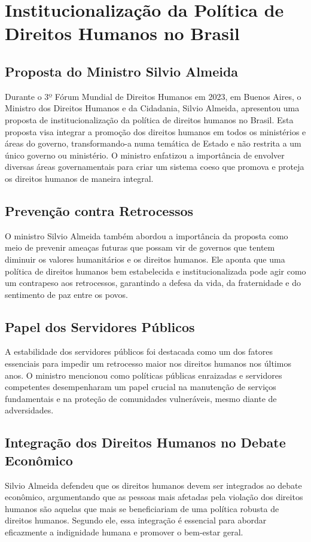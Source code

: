 \documentclass[
   article,       
   12pt,          
   oneside,       
   a4paper,       
   english,       
   brazil,        
   sumario=tradicional
   ]{abntex2}
\begin{document}
\section{Institucionalização da Política de Direitos Humanos no Brasil}

\subsection{Proposta do Ministro Silvio Almeida}
Durante o 3º Fórum Mundial de Direitos Humanos em 2023, em Buenos Aires, o Ministro dos Direitos Humanos e da Cidadania, Silvio Almeida, apresentou uma proposta de institucionalização da política de direitos humanos no Brasil. Esta proposta visa integrar a promoção dos direitos humanos em todos os ministérios e áreas do governo, transformando-a numa temática de Estado e não restrita a um único governo ou ministério. O ministro enfatizou a importância de envolver diversas áreas governamentais para criar um sistema coeso que promova e proteja os direitos humanos de maneira integral.

\subsection{Prevenção contra Retrocessos}
O ministro Silvio Almeida também abordou a importância da proposta como meio de prevenir ameaças futuras que possam vir de governos que tentem diminuir os valores humanitários e os direitos humanos. Ele aponta que uma política de direitos humanos bem estabelecida e institucionalizada pode agir como um contrapeso aos retrocessos, garantindo a defesa da vida, da fraternidade e do sentimento de paz entre os povos.

\subsection{Papel dos Servidores Públicos}
A estabilidade dos servidores públicos foi destacada como um dos fatores essenciais para impedir um retrocesso maior nos direitos humanos nos últimos anos. O ministro mencionou como políticas públicas enraizadas e servidores competentes desempenharam um papel crucial na manutenção de serviços fundamentais e na proteção de comunidades vulneráveis, mesmo diante de adversidades.

\subsection{Integração dos Direitos Humanos no Debate Econômico}
Silvio Almeida defendeu que os direitos humanos devem ser integrados ao debate econômico, argumentando que as pessoas mais afetadas pela violação dos direitos humanos são aquelas que mais se beneficiariam de uma política robusta de direitos humanos. Segundo ele, essa integração é essencial para abordar eficazmente a indignidade humana e promover o bem-estar geral.
\end{document}
